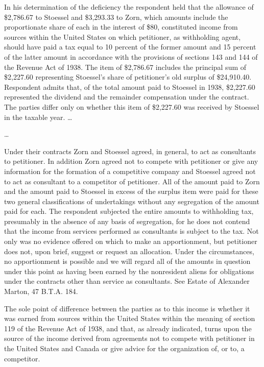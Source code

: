 \begin{select}
In his determination of the deficiency the respondent held that the allowance of \$2,786.67 to Stoessel and \$3,293.33 to Zorn, which amounts include the proportionate share of each in the interest of \$80, constituted income from sources within the United States on which petitioner, as withholding agent, should have paid a tax equal to 10 percent of the former amount and 15 percent of the latter amount in accordance with the provisions of sections 143 and 144 of the Revenue Act of 1938. The item of \$2,786.67 includes the principal sum of \$2,227.60 representing Stoessel's share of petitioner's old surplus of \$24,910.40. Respondent admits that, of the total amount paid to Stoessel in 1938, \$2,227.60 represented the dividend and the remainder compensation under the contract. The parties differ only on whether this item of \$2,227.60 was received by Stoessel in the taxable year. \ldots

\ldots

Under their contracts Zorn and Stoessel agreed, in general, to act as consultants to petitioner. In addition Zorn agreed not to compete with petitioner or give any information for the formation of a competitive company and Stoessel agreed not to act as consultant to a competitor of petitioner. All of the amount paid to Zorn and the amount paid to Stoessel in excess of the surplus item were paid for these two general classifications of undertakings without any segregation of the amount paid for each. The respondent subjected the entire amounts to withholding tax, presumably in the absence of any basis of segregation, for he does not contend that the income from services performed as consultants is subject to the tax. Not only was no evidence offered on which to make an apportionment, but petitioner does not, upon brief, suggest or request an allocation. Under the circumstances, no apportionment is possible and we will regard all of the amounts in question under this point as having been earned by the nonresident aliens for obligations under the contracts other than service as consultants. See Estate of Alexander Marton, 47 B.T.A. 184.

The sole point of difference between the parties as to this income is whether it was earned from sources within the United States within the meaning of section 119 of the Revenue Act of 1938, and that, as already indicated, turns upon the source of the income derived from agreements not to compete with petitioner in the United States and Canada or give advice for the organization of, or to, a competitor.


\end{select}
